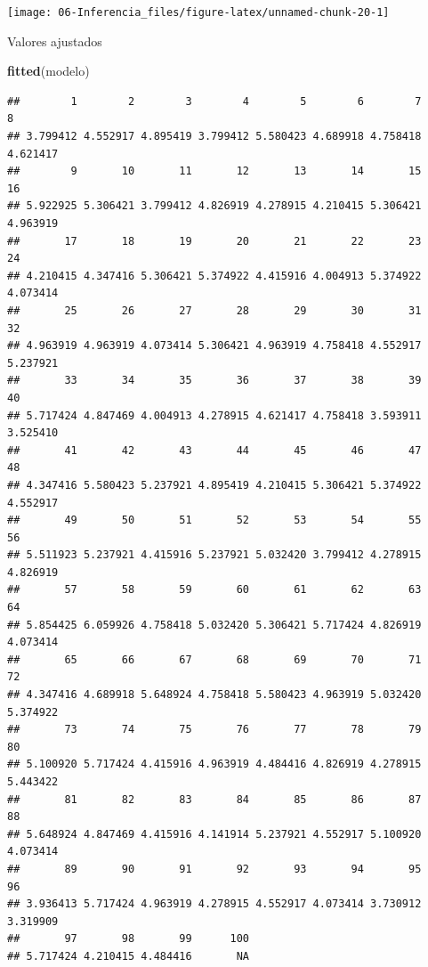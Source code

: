 \documentclass[]{book}
\newenvironment{Shaded}{\begin{snugshade}}{\end{snugshade}}
\newcommand{\KeywordTok}[1]{\textcolor[rgb]{0.13,0.29,0.53}{\textbf{#1}}}
\newcommand{\NormalTok}[1]{#1}
\begin{document}
\begin{center}\texttt{[image: 06-Inferencia\_files/figure-latex/unnamed-chunk-20-1]} \end{center}

Valores ajustados

\begin{Shaded}
\begin{Highlighting}[]
\KeywordTok{fitted}\NormalTok{(modelo)}
\end{Highlighting}
\end{Shaded}

\begin{verbatim}
##        1        2        3        4        5        6        7        8 
## 3.799412 4.552917 4.895419 3.799412 5.580423 4.689918 4.758418 4.621417 
##        9       10       11       12       13       14       15       16 
## 5.922925 5.306421 3.799412 4.826919 4.278915 4.210415 5.306421 4.963919 
##       17       18       19       20       21       22       23       24 
## 4.210415 4.347416 5.306421 5.374922 4.415916 4.004913 5.374922 4.073414 
##       25       26       27       28       29       30       31       32 
## 4.963919 4.963919 4.073414 5.306421 4.963919 4.758418 4.552917 5.237921 
##       33       34       35       36       37       38       39       40 
## 5.717424 4.847469 4.004913 4.278915 4.621417 4.758418 3.593911 3.525410 
##       41       42       43       44       45       46       47       48 
## 4.347416 5.580423 5.237921 4.895419 4.210415 5.306421 5.374922 4.552917 
##       49       50       51       52       53       54       55       56 
## 5.511923 5.237921 4.415916 5.237921 5.032420 3.799412 4.278915 4.826919 
##       57       58       59       60       61       62       63       64 
## 5.854425 6.059926 4.758418 5.032420 5.306421 5.717424 4.826919 4.073414 
##       65       66       67       68       69       70       71       72 
## 4.347416 4.689918 5.648924 4.758418 5.580423 4.963919 5.032420 5.374922 
##       73       74       75       76       77       78       79       80 
## 5.100920 5.717424 4.415916 4.963919 4.484416 4.826919 4.278915 5.443422 
##       81       82       83       84       85       86       87       88 
## 5.648924 4.847469 4.415916 4.141914 5.237921 4.552917 5.100920 4.073414 
##       89       90       91       92       93       94       95       96 
## 3.936413 5.717424 4.963919 4.278915 4.552917 4.073414 3.730912 3.319909 
##       97       98       99      100 
## 5.717424 4.210415 4.484416       NA
\end{verbatim}
\end{document}
